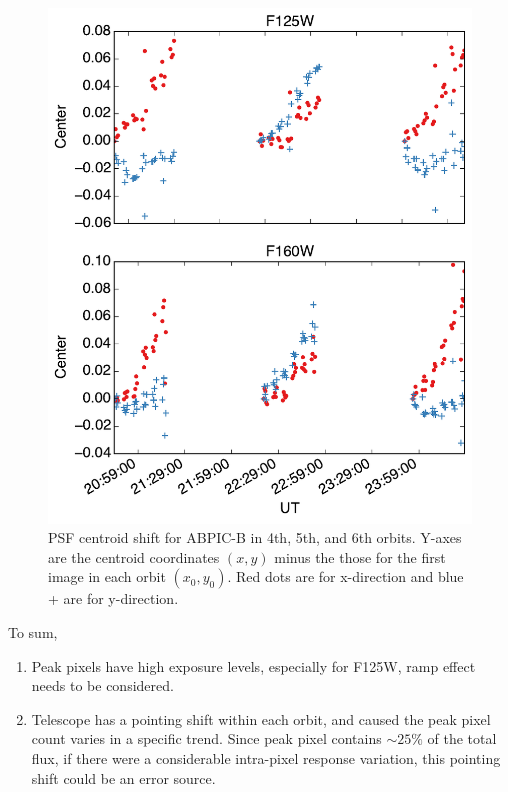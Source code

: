 \documentclass[paper=letter, fontsize=11pt]{scrartcl} %
\numberwithin{equation}{section} %
\numberwithin{figure}{section} %
\numberwithin{table}{section} %
\begin{document}
  \begin{figure}[th]
    \centering
    \includegraphics[width=1.0\textwidth]{Ymove}
    \caption{PSF centroid shift for ABPIC-B in 4th, 5th, and 6th
      orbits. Y-axes are the centroid coordinates $(x, y)$ minus the
      those for the first image in each orbit $(x_0, y_0)$. Red dots
      are for x-direction and blue + are for y-direction.}
    \label{fig:center}
  \end{figure}

  To sum,
  \begin{enumerate}
  \item Peak pixels have high exposure levels, especially for F125W,
    ramp effect needs to be considered.
  \item Telescope has a pointing shift within each orbit, and caused
    the peak pixel count varies in a specific trend. Since peak pixel
    contains $\sim 25\%$ of the total flux, if there were a
    considerable intra-pixel response variation, this pointing shift
    could be an error source.
  \end{enumerate}
\end{document}
